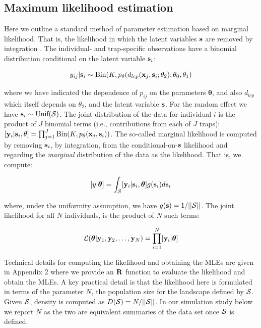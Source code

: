 \documentclass[12pt]{article}
\begin{document}
\begin{spacing}{1.8}
\section{Maximum likelihood estimation}
\label{sec.mle}

Here we outline a standard method of parameter estimation based on
marginal likelihood. That is, the likelihood in which the latent
variables ${\bf s}$ are removed by integration \citep{borchers_efford:2008}.
The individual- and trap-specific observations have a binomial
distribution conditional on the latent variable ${\bf s}_{i}$:

\begin{equation}
	y_{ij}| {\bf s}_{i} \sim \mbox{Bin}(K, p_{\theta}(d_{lcp}({\bf x}_{j},{\bf s}_{i};\theta_{2}); \theta_{0}, \theta_{1})
\label{mle.eq.cond-on-s}
\end{equation}

{\flushleft where} we have indicated the dependence of $p_{ij}$ on the parameters
${\bm \theta}$, and also $d_{lcp}$ which
itself depends on $\theta_{2}$, and the latent variable ${\bf s}$.
For the random effect we have ${\bf s}_{i} \sim  \mbox{Unif}({\cal
  S})$.
The joint distribution of the data for individual $i$ is the product
of $J$ binomial terms (i.e., contributions from each of $J$ traps):
$  [{\bf y}_{i} | {\bf s}_{i} , \theta] =
  \prod_{j=1}^{J} \mbox{Bin}(K, p_{\theta}({\bf x}_{j},{\bf s}_{i}) )$.
 The so-called marginal likelihood is computed by removing
${\bf s}_{i}$, by integration,  from the conditional-on-${\bf s}$
likelihood and regarding the {\it marginal} distribution of the data
as the likelihood. That
is, we compute:

\[
  [y|{\bm \theta}] =
\int_{{\cal S}}  [ {\bf y}_{i} |{\bf s}_{i},{\bm \theta}] g({\bf s}_{i}) d{\bf s}_{i}
\]

{\flushleft where}, under the uniformity assumption, we have
$g({\bf s}) = 1/||{\cal S}||$.
The joint likelihood for all $N$ individuals,
is the product of $N$ such terms:

\[
{\cal L}({\bm \theta} | {\bf y}_{1},{\bf y}_{2},\ldots, {\bf y}_{N}) = \prod_{i=1}^{N}
[{\bf y}_{i}|{\bm \theta}]
\]

Technical details for computing the likelihood and obtaining the MLEs
are given in Appendix 2 where we provide an ${\bf R}$ function
to evaluate the likelihood and obtain the MLEs.
A key practical detail is that the likelihood here is formulated in
terms of the parameter $N$, the population size for the landscape
defined by ${\cal S}$. Given ${\cal S}$, density
is
computed as $D({\cal S}) = N/||{\cal S}||$. In our simulation study
below we report $N$ as the two are equivalent summaries of the data
set once ${\cal S}$ is defined.



\end{spacing}
\end{document}
